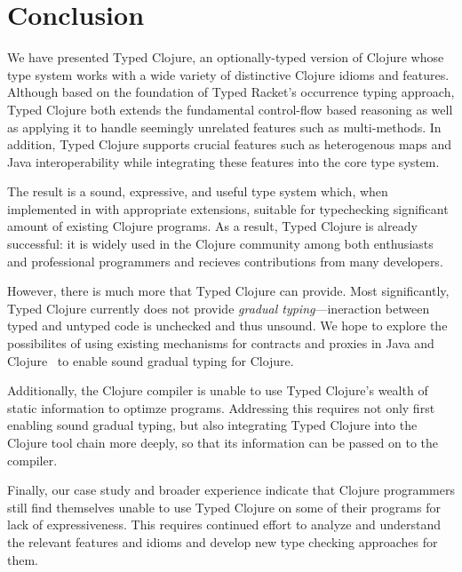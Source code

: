 \section{Conclusion}
\label{sec:conclusion}

We have presented Typed Clojure, an optionally-typed version of
Clojure whose type system works with a wide variety of distinctive
Clojure idioms and features. Although based on the foundation of Typed
Racket's occurrence typing approach, Typed Clojure both extends the
fundamental control-flow based reasoning as well as applying it to
handle seemingly unrelated features such as multi-methods. In
addition, Typed Clojure supports crucial features such as heterogenous
maps and Java interoperability while integrating these features into
the core type system.

The result is a sound, expressive, and useful type system which, when
implemented in \coretyped with appropriate extensions, suitable for
typechecking significant amount of existing Clojure programs.
%
As a result, Typed Clojure is already successful: it is widely used in
the Clojure community among both enthusiasts and professional
programmers and recieves contributions from many developers.

However, there is much more that Typed Clojure can provide. Most
significantly, Typed Clojure currently does not provide \emph{gradual
  typing}---ineraction between typed and untyped code is unchecked and
thus unsound. We hope to explore the possibilites of using existing
mechanisms for contracts and proxies in Java and
Clojure~\cite{some-stuff} to enable sound gradual typing for Clojure.

Additionally, the Clojure compiler is unable to use Typed Clojure's
wealth of static information to optimze programs. Addressing this
requires not only first enabling sound gradual typing, but also
integrating Typed Clojure into the Clojure tool chain more deeply, so
that its information can be passed on to the compiler. 

Finally, our case study and broader experience indicate that Clojure
programmers still find themselves unable to use Typed Clojure on some
of their programs for lack of expressiveness. This requires continued
effort to analyze and understand the relevant features and idioms and
develop new type checking approaches for them.

